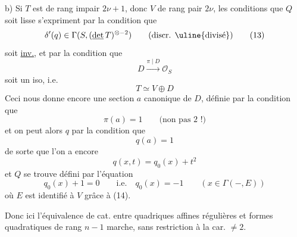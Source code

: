 b) Si $T$ est de rang impair $2\nu+1$, donc $V$ de rang pair $2\nu$, les conditions que $Q$ soit
lisse s'expriment par la condition que
\[
\delta'(q)\in\Gamma(S,(\underline{\det}\,T)^{\otimes-2})\qquad\text{(discr. \uline{divisé})}\tag*{(13)}
\]
soit \uline{inv.}, et par la condition que
\[
D\xrightarrow{\pi\mid D}\mathcal O_S
\]
soit un iso, i.e.
\[
T\simeq V\oplus D\tag*{(14)}
\]
Ceci nous donne encore une section $a$ canonique de $D$, définie par la condition que
\[
\pi(a)=1\qquad\text{(non pas 2 !)}\tag*{(15)}
\]
et on peut alors  $q$ par la condition que
\[
q(a)=1\tag*{(16)}
\]
de sorte que l'on a encore
\[
q(x,t)=q_0(x)+t^2\tag*{(17)}
\]
et $Q$ se trouve défini par l'équation
\[
q_0(x)+1=0\qquad\text{i.e.}\quad q_0(x)=-1\qquad(x\in\Gamma(-,E))\tag*{(18)}
\]
où $E$ est identifié à $V$ grâce à (14).

Donc ici l'équivalence de cat. entre quadriques affines régulières  et formes quadratiques  de rang $n-1$ marche,
sans restriction à la car. $\ne2$.

